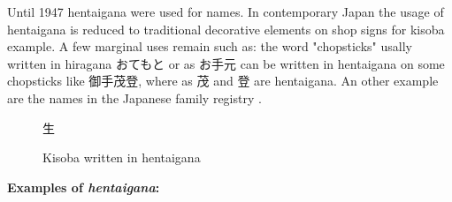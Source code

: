 Until 1947 hentaigana were used for names. In contemporary Japan the usage of
 hentaigana is reduced to traditional decorative elements on shop signs for 
kisoba example. A few marginal uses remain such as: the word "chopsticks" 
  usally written in hiragana {おてもと} or as
{お手元} can be written in hentaigana on some chopsticks like {御手茂登}, where as
{茂} and {登} are hentaigana. An other example are the names in the Japanese 
family registry \lkoseki{}.



\begin{figure}[H]
\begin{center}
\Huge
生𛁛𛂦゙   %
\end{center}
\caption{Kisoba written in hentaigana}
\label{fig:KisobaWrittenInHentaigana}
\end{figure}

\bigskip

\textbf{Examples of \textit{hentaigana}:}

